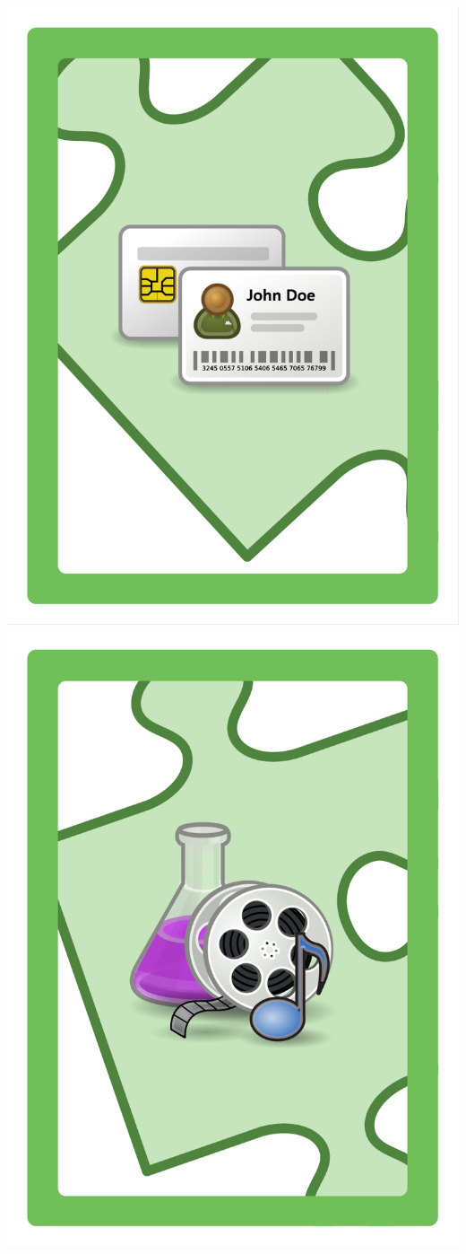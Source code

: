 \documentclass{letter}
\begin{document}
\includegraphics{lo0t/lo0t.shares_auth}
\includegraphics{lo0t/lo0t.shares_ip}
\end{document}

